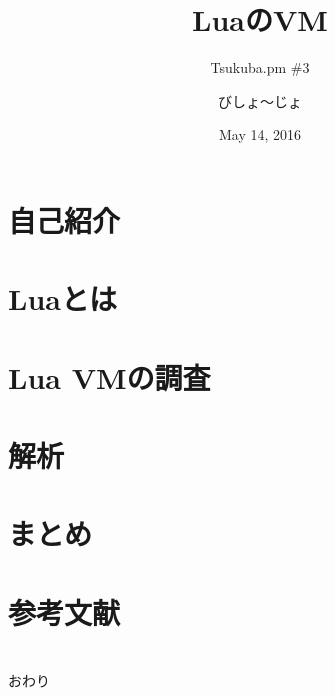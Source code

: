 \documentclass[aspectratio=169,unicode]{beamer}
\title{LuaのVM}
\subtitle{Tsukuba.pm \#{}3}
\author{びしょ〜じょ}
\date{May 14, 2016}
\begin{document}
\maketitle
\skipnexttoc
\section{自己紹介}

\section{Luaとは}

\section{Lua VMの調査}

\section{解析}

\section{まとめ}

\skipnexttoc
\section{参考文献}

\skipnexttoc
\section*{}
\begin{frame}
	\begin{center}
		\Huge{}おわり
	\end{center}
\end{frame}
\end{document}
